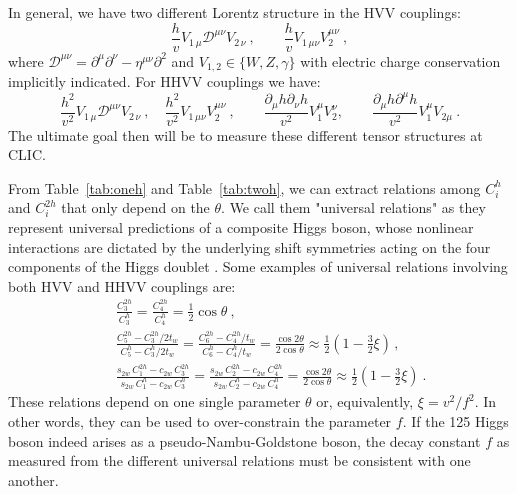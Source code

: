 In general, we have two different Lorentz structure in the HVV couplings:
\begin{equation}
\label{eq:lstruc1}
\frac{h}{v} V_{1\,\mu} \mathcal{D}^{\mu\nu} V_{2\,\nu} \ ,\qquad \frac{h}{v} V_{1\,\mu\nu}  V_2^{\mu\nu} \ ,
\end{equation}
where  ${\mathcal{D}}^{\mu\nu} = \partial^\mu\partial^\nu-\eta^{\mu\nu}\partial^2$ and $V_{1,2} \in\{W, Z,\gamma\}$ with electric charge conservation implicitly indicated. For HHVV couplings we have: 
\begin{equation}
\frac{h^2}{v^2} V_{1\,\mu} {\mathcal{D}}^{\mu\nu} V_{2\,\nu}\ , \quad  \frac{h^2}{v^2} V_{1\,\mu\nu}  V_2^{ \mu\nu} \ , \qquad \frac{\partial_\mu h \partial_\nu h}{v^2} V_1^\mu V_2^{\nu}, \qquad \frac{\partial_\mu h \partial^\mu h}{v^2} V_1^\mu V_{2\mu} \ .
\label{eq:lstruc2}
\end{equation}
The ultimate goal then will be to measure these different tensor structures at CLIC.

From Table~\ref{tab:oneh} and Table~\ref{tab:twoh}, we can extract relations among $C_i^{h}$ and $C_i^{2h}$ that only depend on the $\theta$. We call them "universal relations" as they represent universal predictions of a composite Higgs boson, whose nonlinear interactions are dictated by the underlying shift symmetries acting on the four components of the Higgs doublet \cite{Low:2014nga,Low:2014oga,Liu:2018vel,Liu:2018qtb}.  Some examples of universal relations involving both HVV and HHVV couplings are:
\begin{eqnarray}
\label{eq:ident3}
&& \frac{C^{2h}_3}{C^h_3} = \frac{C^{2h}_4}{C^h_4} =\frac12 \cos\theta  \ ,\\
\label{eq:ident4}
&& \frac{C^{2h}_5 - C^{2h}_3 /2t_w} {C^h_5 - C^{h}_3/2t_{w}} =  \frac{C^{2h}_6 -C^{2h}_4/t_{w} }{C^h_6 - C^{h}_4/t_{w}} = \frac{\cos2\theta}{2\cos\theta} \approx \frac12\left(1 - \frac32 \xi \right)\, ,\\
&&\frac{s_{2w} \,C^{2h}_1 - c_{2w}\,   C^{2h}_3} {s_{2w}\, C^h_1-c_{2w} \,  C^{h}_3} =\frac{s_{2w}\, C^{2h}_2 - c_{2w}\,   C^{2h}_4} {s_{2w}\, C^h_2-c_{2w}\,   C^{h}_4}  = \frac{\cos2\theta}{2\cos\theta}\approx \frac12\left(1 - \frac32 \xi \right)\ .
\end{eqnarray}
These relations depend on one single parameter $\theta$ or, equivalently, $\xi=v^2/f^2$. In other words, they can be used to over-constrain the parameter $f$. If the 125 \UGeV Higgs boson indeed arises as a pseudo-Nambu-Goldstone boson, the decay constant $f$ as measured from the different universal relations must be consistent with one another.






